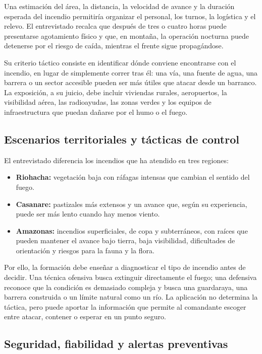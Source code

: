 Una estimación del área, la distancia, la velocidad de avance y la duración esperada del incendio permitiría organizar el personal, los turnos, la logística y el relevo. El entrevistado recalca que después de tres o cuatro horas puede presentarse agotamiento físico y que, en montaña, la operación nocturna puede detenerse por el riesgo de caída, mientras el frente sigue propagándose.

Su criterio táctico consiste en identificar dónde conviene encontrarse con el incendio, en lugar de simplemente correr tras él: una vía, una fuente de agua, una barrera o un sector accesible pueden ser más útiles que atacar desde un barranco. La exposición, a su juicio, debe incluir viviendas rurales, aeropuertos, la visibilidad aérea, las radioayudas, las zonas verdes y los equipos de infraestructura que puedan dañarse por el humo o el fuego.

\subsection{Escenarios territoriales y tácticas de control}

El entrevistado diferencia los incendios que ha atendido en tres regiones:

\begin{itemize}
  \item \textbf{Riohacha:} vegetación baja con ráfagas intensas que cambian el sentido del fuego.
  \item \textbf{Casanare:} pastizales más extensos y un avance que, según su experiencia, puede ser más lento cuando hay menos viento.
  \item \textbf{Amazonas:} incendios superficiales, de copa y subterráneos, con raíces que pueden mantener el avance bajo tierra, baja visibilidad, dificultades de orientación y riesgos para la fauna y la flora.
\end{itemize}

Por ello, la formación debe enseñar a diagnosticar el tipo de incendio antes de decidir. Una técnica ofensiva busca extinguir directamente el fuego; una defensiva reconoce que la condición es demasiado compleja y busca una guardaraya, una barrera construida o un límite natural como un río. La aplicación no determina la táctica, pero puede aportar la información que permite al comandante escoger entre atacar, contener o esperar en un punto seguro.

\subsection{Seguridad, fiabilidad y alertas preventivas}

